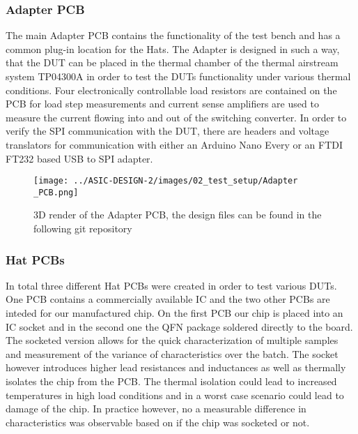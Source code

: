 \clearpage

\subsubsection{Adapter PCB}
The main Adapter \ac{PCB} contains the functionality of the test bench and has a common plug-in location for the Hats. The Adapter is designed in such a way, that the \ac{DUT} can be placed in the thermal chamber of the thermal airstream system TP04300A in order to test the \ac{DUT}s functionality under various thermal conditions. Four electronically controllable load resistors are contained on the \ac{PCB} for load step measurements and current sense amplifiers are used to measure the current flowing into and out of the switching converter. In order to verify the SPI communication with the \ac{DUT}, there are headers and voltage translators for communication with either an Arduino Nano Every or an FTDI FT232 based USB to SPI adapter.

\begin{figure}[h]
    \centering
    \texttt{[image: ../ASIC-DESIGN-2/images/02\_test\_setup/Adapter \_PCB.png]}
    \caption{3D render of the Adapter PCB, the design files can be found in the following git repository \cite{PCB_schematic}}
    \label{fig:Adapter_PCB}
\end{figure}

\clearpage

\subsubsection{Hat PCBs}
In total three different Hat \ac{PCB}s were created in order to test various \ac{DUT}s. One \ac{PCB} contains a commercially available \ac{IC} and the two other \ac{PCB}s are inteded for our manufactured chip. On the first \ac{PCB} our chip is placed into an \ac{IC} socket and in the second one the QFN package soldered directly to the board. The socketed version allows for the quick characterization of multiple samples and measurement of the variance of characteristics over the batch. The socket however introduces higher lead resistances and inductances as well as thermally isolates the chip from the \ac{PCB}. The thermal isolation could lead to increased temperatures in high load conditions and in a worst case scenario could lead to damage of the chip. In practice however, no a measurable difference in characteristics was observable based on if the chip was socketed or not.\\


